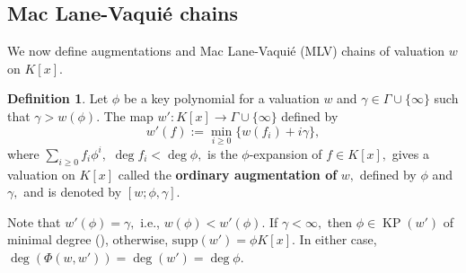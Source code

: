 \documentclass[11pt]{amsart}
\theoremstyle{definition}
\newtheorem{definition}[theorem]{Definition}
\theoremstyle{remark}
\numberwithin{equation}{section}
\begin{document}
%			

\subsection{Mac Lane-Vaqui\'e chains}

We now define augmentations and Mac Lane-Vaqui\'e (MLV) chains of valuation $w$ on $K[x].$
\begin{definition}
	Let $\phi$ be a key polynomial for a valuation $w$ and $\gamma\in\Gamma\cup\{\infty\}$ such that $\gamma> w(\phi)$. The map $w': K[x]\longrightarrow \Gamma\cup\{\infty\}$ defined by 
	$$w'(f):=\min_{i\geq 0}\{w(f_i)+i\gamma\},$$ where
	$\sum_{i\geq 0}f_i \phi^i, $ $\deg f_i<\deg \phi,$ is the $\phi$-expansion of $f\in K[x],$  gives a valuation on $K[x]$  called the {\bf ordinary augmentation of} $w,$ defined by $\phi$ and $\gamma,$ and is  denoted  by $[w; \phi,\gamma].$
\end{definition}
Note that $w'(\phi)=\gamma,$ i.e., $w(\phi)<w'(\phi).$ If $\gamma<\infty,$ then $\phi\in\operatorname{KP}(w')$ of minimal degree (\cite[Proposition 2.1]{EN1}), otherwise, $\text{supp}(w')=\phi K[x].$ In either case, $\deg(\Phi(w,w'))=\deg (w')=\deg\phi.$ 
\end{document}
